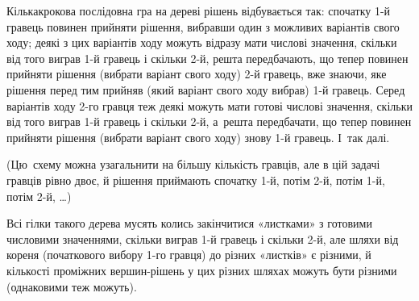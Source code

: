 ﻿Кількакрокова послідовна гра на дереві рішень відбувається так:
спочатку 1-й гравець повинен прийняти рішення, вибравши один з можливих варіантів свого ходу; 
деякі з цих варіантів ходу можуть відразу мати числові значення, скільки від того виграв 1-й гравець і скільки 2-й, 
решта передбачають, що тепер повинен прийняти рішення (вибрати варіант свого ходу) 2-й гравець, 
вже знаючи, яке рішення перед тим прийняв (який варіант свого ходу вибрав) 1-й гравець.
Серед варіантів ходу 2-го гравця теж деякі можуть мати готові числові значення, скільки від того виграв 1-й гравець і скільки 2-й,
а~решта передбачати, що тепер повинен прийняти рішення (вибрати варіант свого ходу) знову 1-й гравець.
І~так далі.

(Цю~схему можна узагальнити на більшу кількість гравців, але в цій задачі гравців рівно двоє, й рішення приймають спочатку 1-й, потім 2-й, потім 1-й, потім 2-й, \dots) 

Всі гілки такого д{\it е}рева мусять колись закінчитися «листками» з готовими числовими значеннями, скільки виграв 1-й гравець і скільки 2-й, але шляхи від кореня (початкового вибору 1-го гравця) до різних «листків» є різними, й кількості проміжних вершин-рішень у цих різних шляхах можуть бути різними (однаковими теж можуть).






